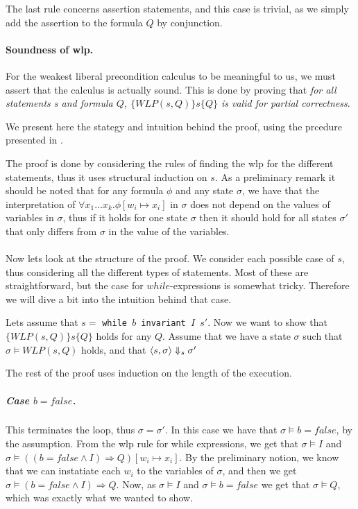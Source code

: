 The last rule concerns assertion statements, and this case is trivial, as we simply add the assertion to the formula $Q$ by conjunction.

\paragraph{Soundness of wlp.}
For the weakest liberal precondition calculus to be meaningful to us, we must assert that the calculus is actually sound.
This is done by proving that \textit{for all statements s and formula $Q$, $\{WLP(s, Q)\}s\{Q\}$ is valid for partial correctness}.

We present here the stategy and intuition behind the proof, using the prcedure presented in \cite{wlp}.

The proof is done by considering the rules of finding the wlp for the different statements, thus it uses structural induction on $s$.
As a preliminary remark it should be noted that for any formula $\phi$ and any state $\sigma$, we have that the interpretation of $\forall x_{1} ... x_{k} . \phi [w_{i} \mapsto x_{i}]$ in $\sigma$ does not depend on the values of variables in $\sigma$, thus if it holds for one state $\sigma$ then it should hold for all states $\sigma'$ that only differs from $\sigma$ in the value of the variables.
\\~\\
Now lets look at the structure of the proof.
We consider each possible case of $s$, thus considering all the different types of statements.
Most of these are straightforward, but the case for $while$-expressions is somewhat tricky.
Therefore we will dive a bit into the intuition behind that case.

Lets assume that $s =$ \texttt{while $b$ invariant $I$ $s'$}.
Now we want to show that $\{WLP(s, Q)\}s\{Q\}$ holds for any $Q$.
Assume that we have a state $\sigma$ such that $\sigma \vDash WLP(s, Q)$ holds, and that $\langle s,\sigma \rangle \Downarrow_{s} \sigma'$

The rest of the proof uses induction on the length of the execution.

\subparagraph{Case $b=false$.}
This terminates the loop, thus $\sigma = \sigma'$.
In this case we have that $\sigma \vDash b = false$, by the assumption.
From the wlp rule for while expressions, we get that $\sigma \vDash I$ and $\sigma \vDash ((b = false \land I) \Rightarrow Q) [ w_{i} \mapsto x_{i}]$.
By the preliminary notion, we know that we can instatiate each $w_{i}$ to the variables of $\sigma$,
and then we get $\sigma \vDash (b = false \land I) \Rightarrow Q$.
Now, as $\sigma \vDash I$ and $\sigma \vDash b = false$ we get that $\sigma \vDash Q $, which was exactly what we wanted to show.

